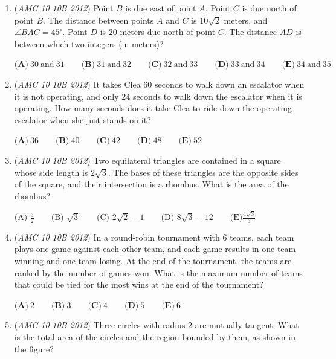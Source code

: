 \begin{enumerate}
 $\textbf{(A)}\ 729\qquad\textbf{(B)}\ 972\qquad\textbf{(C)}\ 1024\qquad\textbf{(D)}\ 2187\qquad\textbf{(E)}\ 2304$


	\item (\textit{AMC 10 10B 2012}) Point $B$ is due east of point $A$. Point $C$ is due north of point $B$. The distance between points $A$ and $C$ is $10\sqrt 2$ meters, and $\angle BAC = 45^\circ$. Point $D$ is $20$ meters due north of point $C$. The distance $AD$ is between which two integers (in meters)?


 $\textbf{(A)}\ 30\ \text{and}\ 31 \qquad\textbf{(B)}\ 31\ \text{and}\ 32 \qquad\textbf{(C)}\ 32\ \text{and}\ 33 \qquad\textbf{(D)}\ 33\ \text{and}\ 34 \qquad\textbf{(E)}\ 34\ \text{and}\ 35$


	\item (\textit{AMC 10 10B 2012}) It takes Clea 60 seconds to walk down an escalator when it is not operating, and only 24 seconds to walk down the escalator when it is operating. How many seconds does it take Clea to ride down the operating escalator when she just stands on it?


 $\textbf{(A)}\ 36\qquad\textbf{(B)}\ 40\qquad\textbf{(C)}\ 42\qquad\textbf{(D)}\ 48\qquad\textbf{(E)}\ 52$


	\item (\textit{AMC 10 10B 2012}) Two equilateral triangles are contained in a square whose side length is $2\sqrt 3$. The bases of these triangles are the opposite sides of the square, and their intersection is a rhombus. What is the area of the rhombus?


 $\text{(A) } \frac{3}{2} \qquad \text{(B) } \sqrt 3 \qquad \text{(C) } 2\sqrt 2 -   1  \qquad \text{(D) } 8\sqrt 3 - 12 \qquad \text{(E)}  \frac{4\sqrt 3}{3}$


	\item (\textit{AMC 10 10B 2012}) In a round-robin tournament with 6 teams, each team plays one game against each other team, and each game results in one team winning and one team losing. At the end of the tournament, the teams are ranked by the number of games won. What is the maximum number of teams that could be tied for the most wins at the end of the tournament?


 $\textbf{(A)}\ 2\qquad\textbf{(B)}\ 3\qquad\textbf{(C)}\ 4\qquad\textbf{(D)}\ 5\qquad\textbf{(E)}\ 6$


	\item (\textit{AMC 10 10B 2012}) Three circles with radius 2 are mutually tangent. What is the total area of the circles and the region bounded by them, as shown in the figure?



\end{enumerate}
